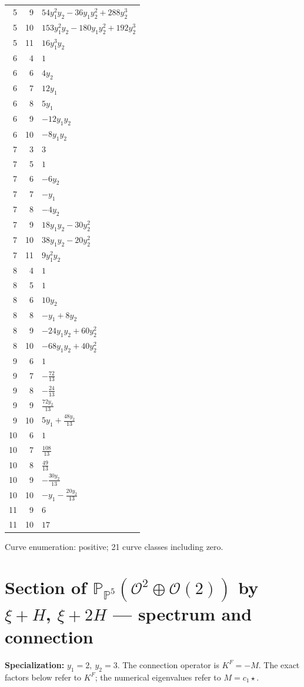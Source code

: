 \documentclass[10pt,a4paper]{article}
\begin{document}
{\begin{longtable}{rrp{125mm}}
5 & 9 & $54 y_{1}^{2} y_{2} - 36 y_{1} y_{2}^{2} + 288 y_{2}^{3}$\\
5 & 10 & $153 y_{1}^{2} y_{2} - 180 y_{1} y_{2}^{2} + 192 y_{2}^{3}$\\
5 & 11 & $16 y_{1}^{3} y_{2}$\\
6 & 4 & $1$\\
6 & 6 & $4 y_{2}$\\
6 & 7 & $12 y_{1}$\\
6 & 8 & $5 y_{1}$\\
6 & 9 & $- 12 y_{1} y_{2}$\\
6 & 10 & $- 8 y_{1} y_{2}$\\
7 & 3 & $3$\\
7 & 5 & $1$\\
7 & 6 & $- 6 y_{2}$\\
7 & 7 & $- y_{1}$\\
7 & 8 & $- 4 y_{2}$\\
7 & 9 & $18 y_{1} y_{2} - 30 y_{2}^{2}$\\
7 & 10 & $38 y_{1} y_{2} - 20 y_{2}^{2}$\\
7 & 11 & $9 y_{1}^{2} y_{2}$\\
8 & 4 & $1$\\
8 & 5 & $1$\\
8 & 6 & $10 y_{2}$\\
8 & 8 & $- y_{1} + 8 y_{2}$\\
8 & 9 & $- 24 y_{1} y_{2} + 60 y_{2}^{2}$\\
8 & 10 & $- 68 y_{1} y_{2} + 40 y_{2}^{2}$\\
9 & 6 & $1$\\
9 & 7 & $- \frac{72}{13}$\\
9 & 8 & $- \frac{24}{13}$\\
9 & 9 & $\frac{72 y_{2}}{13}$\\
9 & 10 & $5 y_{1} + \frac{48 y_{2}}{13}$\\
10 & 6 & $1$\\
10 & 7 & $\frac{108}{13}$\\
10 & 8 & $\frac{49}{13}$\\
10 & 9 & $- \frac{30 y_{2}}{13}$\\
10 & 10 & $- y_{1} - \frac{20 y_{2}}{13}$\\
11 & 9 & $6$\\
11 & 10 & $17$\\
\end{longtable}}
Curve enumeration: positive; 21 curve classes including zero.
\clearpage\section*{Section of $\mathbb P_{\mathbb P^{5}}(\mathcal O^{2}\oplus \mathcal O(2))$ by $\xi +H$, $\xi +2H$ --- spectrum and connection}
\textbf{Specialization:} $y_1=2,\ y_2=3$. The connection operator is $K^F=-M$. The exact factors below refer to $K^F$; the numerical eigenvalues refer to $M=c_1\star$.
\end{document}
